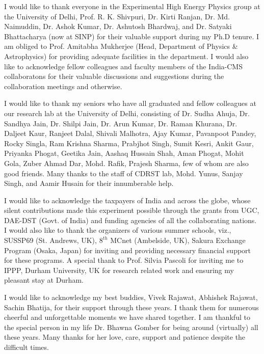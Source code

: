 I would like to thank everyone in the Experimental High Energy Physics group at the University of Delhi, Prof. R. K. Shivpuri, Dr. Kirti Ranjan, Dr. Md. Naimuddin, 
Dr. Ashok Kumar, Dr. Ashutosh Bhardwaj, and Dr. Satyaki Bhattacharya (now at SINP) for their valuable support during my Ph.D tenure. 
I am obliged to Prof. Amitabha Mukherjee (Head, Department of Physics \& Astrophysics) for providing adequate facilities in the department.
I would also like to acknowledge fellow colleagues and faculty members of the India-CMS collaboratons for their valuable discussions and suggestions during the 
collaboration meetings and otherwise.

I would like to thank my seniors who have all graduated and fellow colleagues at our research lab at the University of Delhi, consisting of Dr. Sudha Ahuja, Dr. Sandhya Jain, 
Dr. Shilpi Jain, Dr. Arun Kumar, Dr. Raman Khurana, Dr. Daljeet Kaur, Ranjeet Dalal, Shivali Malhotra, Ajay Kumar, Pavanpoot Pandey, Rocky Singla, Ram Krishna Sharma, 
Prabjhot Singh, Sumit Kesri, Ankit Gaur, Priyanka Phogat, Geetika Jain, Aashaq Hussain Shah, Aman Phogat, Mohit Gola, Zuber Ahmad Dar, Mohd. Rafik, Prajesh Sharma, few of 
whom are also good friends.
Many thanks to the staff of CDRST lab, Mohd. Yunus, Sanjay Singh, and Aamir Husain for their innumberable help.

I would like to acknowledge the taxpayers of India and across the globe, whose silent contributions made this experiment possible through the grants from
UGC, DAE-DST (Govt. of India) and funding agencies of all the collaborating nations. I would also like to thank the organizers of various summer schools, viz., 
SUSSP69 (St. Andrews, UK), $8^{th}$ MCnet (Ambelside, UK), Sakura Exchange Program (Osaka, Japan) for inviting and providing necessary financial support for these 
programs. A special thank to Prof. Silvia Pascoli for inviting me to IPPP, Durham University, UK for research related work and ensuring my pleasant stay at Durham.

  
I would like to acknowledge my best buddies, Vivek Rajawat, Abhishek Rajawat, Sachin Bhatija, for their support through these years.
I thank them for numerous cheerful and unforgettable moments we have shared together.
I am thankful to the special person in my life Dr. Bhawna Gomber for being around (virtually) all these years. Many thanks for her love, care, support and patience
despite the difficult times.

